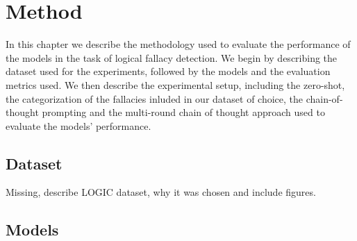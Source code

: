\chapter{Method}

In this chapter we describe the methodology used to evaluate the performance of the models in the task of logical fallacy detection. We begin by describing the dataset used for the experiments, followed by the models and the evaluation metrics used. We then describe the experimental setup, including the zero-shot, the categorization of the fallacies inluded in our dataset of choice, the chain-of-thought prompting and the multi-round chain of thought approach used to evaluate the models' performance.

\section{Dataset}

Missing, describe LOGIC dataset, why it was chosen and include figures.


\section{Models}

